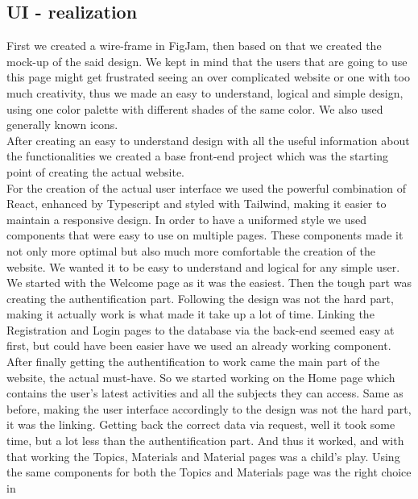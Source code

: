 \documentclass[12pt,a4paper]{article}
\begin{document}
\begin{spacing}{1.5}
    \subsection{UI - realization}
    First we created a wire-frame in FigJam, then based on that we created the
    mock-up of the said design. We kept in mind that the users that are going to
    use this page might get frustrated seeing an over complicated website or one
    with too much creativity, thus we made an easy to understand, logical and
    simple design, using one color palette with different shades of the same color.
    We also used generally known icons. \\ \indent After creating an easy to
    understand design with all the useful information about the functionalities we
    created a base front-end project which was the starting point of creating the
    actual website. \\ \indent For the creation of the actual user interface we
    used the powerful combination of React, enhanced by Typescript and styled with
    Tailwind, making it easier to maintain a responsive design. In order to have a
    uniformed style we used components that were easy to use on multiple pages.
    These components made it not only more optimal but also much more comfortable
    the creation of the website. We wanted it to be easy to understand and logical
    for any simple user. \\ \indent We started with the Welcome page as it was the
    easiest. Then the tough part was creating the authentification part. Following
    the design was not the hard part, making it actually work is what made it take
    up a lot of time. Linking the Registration and Login pages to the database via
    the back-end seemed easy at first, but could have been easier have we used an
    already working component. \\ \indent After finally getting the
    authentification to work came the main part of the website, the actual
    must-have. So we started working on the Home page which contains the user's
    latest activities and all the subjects they can access. Same as before, making
    the user interface accordingly to the design was not the hard part, it was the
    linking. Getting back the correct data via request, well it took some time, but
    a lot less than the authentification part. And thus it worked, and with that
    working the Topics, Materials and Material pages was a child's play. Using the
    same components for both the Topics and Materials page was the right choice in

\end{spacing}
\end{document}
